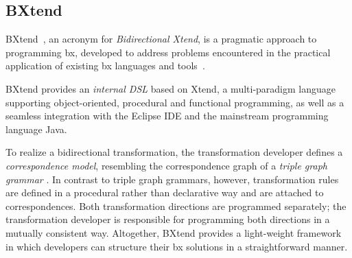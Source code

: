 \subsection{BXtend}
\label{sec:BXtend}

BXtend~\cite{MODELSWARD2018-Buchmann}, an acronym for \emph{Bidirectional Xtend}, is a pragmatic approach to programming bx, developed to address problems encountered in the practical application of existing bx languages and tools~\cite{DBLP:conf/icsoft/BuchmannG16}.

BXtend provides an \emph{internal DSL} based on Xtend, a multi-paradigm language supporting object-oriented, procedural and functional programming, as well as a seamless integration with the Eclipse IDE and the mainstream programming language Java.

To realize a bidirectional transformation, the transformation developer defines a \emph{correspondence model}, resembling the correspondence graph of a \emph{triple graph grammar} \cite{Schurr1994}.
In contrast to triple graph grammars, however, transformation rules are defined in a procedural rather than declarative way and are attached to correspondences.
Both transformation directions are programmed separately; the transformation developer is responsible for programming both directions in a mutually consistent way.
Altogether, BXtend provides a light-weight framework in which developers can structure their bx solutions in a straightforward manner.


